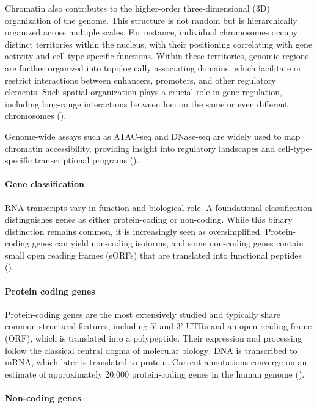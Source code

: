 Chromatin also contributes to the higher-order three-dimensional (3D) organization of the genome.
This structure is not random but is hierarchically organized across multiple scales.
For instance, individual chromosomes occupy distinct territories within the nucleus,
with their positioning correlating with gene activity and cell-type-specific functions.
Within these territories, genomic regions are further organized into topologically associating domains,
which facilitate or restrict interactions between enhancers, promoters, and other regulatory elements.
Such spatial organization plays a crucial role in gene regulation,
including long-range interactions between loci on the same or even different chromosomes (\cite{Elimelech2020}).

Genome-wide assays such as ATAC-seq and DNase-seq are widely used to map chromatin accessibility,
providing insight into regulatory landscapes and cell-type-specific transcriptional programs (\cite{Minnoye2021}).

\paragraph{Gene classification}

RNA transcripts vary in function and biological role.
A foundational classification distinguishes genes as either protein-coding or non-coding.
While this binary distinction remains common, it is increasingly seen as oversimplified.
Protein-coding genes can yield non-coding isoforms, and some non-coding genes contain small open reading frames (sORFs)
that are translated into functional peptides (\cite{Poliseno2024}).

\paragraph{Protein coding genes}

Protein-coding genes are the most extensively studied and typically share common structural features,
including 5' and 3' UTRs and an open reading frame (ORF), which is translated into a polypeptide.
Their expression and processing follow the classical central dogma of molecular biology:
DNA is transcribed to mRNA, which later is translated to protein.
Current annotations
converge on an estimate of approximately 20,000 protein-coding genes in the human genome (\cite{Amaral2023}).

\paragraph{Non-coding genes}

